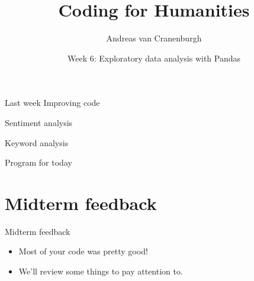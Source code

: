 \documentclass[aspectratio=169,usenames,dvipsnames]{beamer}
\title{Coding for Humanities}
\author{Andreas van Cranenburgh}
\date{Week 6: Exploratory data analysis with Pandas}
\begin{document}
\maketitle


\begin{frame}{Last week}
    Improving code

    \vspace{1em}
    Sentiment analysis

    \vspace{1em}
    Keyword analysis
\end{frame}

\begin{frame}{Program for today}
\tableofcontents
\end{frame}


\section{Midterm feedback}

\begin{frame}{Midterm feedback}
    \begin{itemize}
        \item Most of your code was pretty good!
        \item We'll review some things to pay attention to.
    \end{itemize}
\end{frame}

% 
\end{document}
